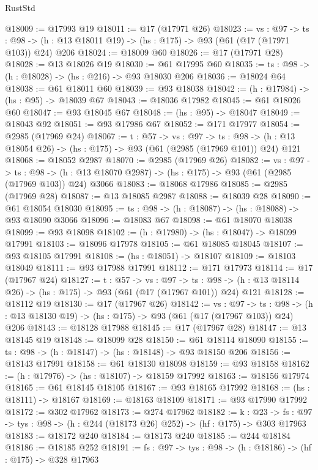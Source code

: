 \begin{lexlean}{RustStd}
\begin{coremodule}
@18009 := @17993 @19
@18011 := @17 (@17971 @26)
@18023 := {vs : @97} ->
  {ts : @98} -> (h : @13 @18011 @19) -> (hs : @175) -> @93 (@61 (@17 (@17971 @103)) @24) @206
@18024 := @18009 @60
@18026 := @17 (@17971 @28)
@18028 := @13 @18026 @19
@18030 := @61 @17995 @60
@18035 := {ts : @98} -> (h : @18028) -> (hs : @216) -> @93 @18030 @206
@18036 := @18024 @64
@18038 := @61 @18011 @60
@18039 := @93 @18038
@18042 := (h : @17984) -> (hs : @95) -> @18039 @67
@18043 := @18036 @17982
@18045 := @61 @18026 @60
@18047 := @93 @18045 @67
@18048 := (hs : @95) -> @18047
@18049 := @18043 @92
@18051 := @93 @17986 @67
@18052 := @171 @17977
@18054 := @2985 (@17969 @24)
@18067 := {t : @57} ->
  {vs : @97} ->
  {ts : @98} -> (h : @13 @18054 @26) -> (hs : @175) -> @93 (@61 (@2985 (@17969 @101)) @24) @121
@18068 := @18052 @2987
@18070 := @2985 (@17969 @26)
@18082 := {vs : @97} ->
  {ts : @98} -> (h : @13 @18070 @2987) -> (hs : @175) -> @93 (@61 (@2985 (@17969 @103)) @24) @3066
@18083 := @18068 @17986
@18085 := @2985 (@17969 @28)
@18087 := @13 @18085 @2987
@18088 := @18039 @28
@18090 := @61 @18054 @18030
@18095 := {ts : @98} -> (h : @18087) -> (hs : @18088) -> @93 @18090 @3066
@18096 := @18083 @67
@18098 := @61 @18070 @18038
@18099 := @93 @18098
@18102 := (h : @17980) -> (hs : @18047) -> @18099 @17991
@18103 := @18096 @17978
@18105 := @61 @18085 @18045
@18107 := @93 @18105 @17991
@18108 := (hs : @18051) -> @18107
@18109 := @18103 @18049
@18111 := @93 @17988 @17991
@18112 := @171 @17973
@18114 := @17 (@17967 @24)
@18127 := {t : @57} ->
  {vs : @97} ->
  {ts : @98} -> (h : @13 @18114 @26) -> (hs : @175) -> @93 (@61 (@17 (@17967 @101)) @24) @121
@18128 := @18112 @19
@18130 := @17 (@17967 @26)
@18142 := {vs : @97} ->
  {ts : @98} -> (h : @13 @18130 @19) -> (hs : @175) -> @93 (@61 (@17 (@17967 @103)) @24) @206
@18143 := @18128 @17988
@18145 := @17 (@17967 @28)
@18147 := @13 @18145 @19
@18148 := @18099 @28
@18150 := @61 @18114 @18090
@18155 := {ts : @98} -> (h : @18147) -> (hs : @18148) -> @93 @18150 @206
@18156 := @18143 @17991
@18158 := @61 @18130 @18098
@18159 := @93 @18158
@18162 := (h : @17976) -> (hs : @18107) -> @18159 @17992
@18163 := @18156 @17974
@18165 := @61 @18145 @18105
@18167 := @93 @18165 @17992
@18168 := (hs : @18111) -> @18167
@18169 := @18163 @18109
@18171 := @93 @17990 @17992
@18172 := @302 @17962
@18173 := @274 @17962
@18182 := {k : @23} ->
  {fs : @97} -> {tys : @98} -> (h : @244 (@18173 @26) @252) -> (hf : @175) -> @303 @17963
@18183 := @18172 @240
@18184 := @18173 @240
@18185 := @244 @18184
@18186 := @18185 @252
@18191 := {fs : @97} -> {tys : @98} -> (h : @18186) -> (hf : @175) -> @328 @17963

\end{coremodule}
\end{lexlean}
